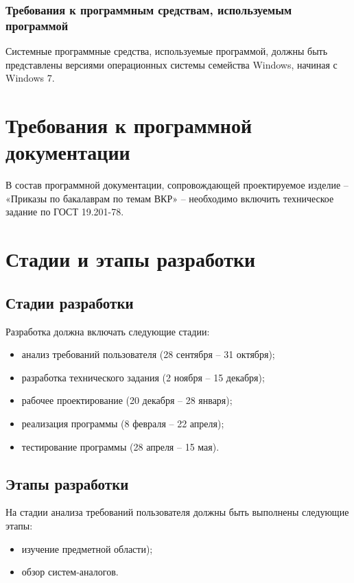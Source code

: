 \documentclass[utf8x]{article}
\begin{document}
\begin{flushleft}
\subsubsection{Требования к программным средствам, используемым программой}

Системные программные средства, используемые программой, должны быть представлены версиями операционных системы семейства Windows, начиная с Windows 7.

\section{Требования к программной документации}

В состав программной документации, сопровождающей проектируемое изделие – «Приказы по бакалаврам по темам ВКР» – необходимо включить техническое задание по ГОСТ 19.201-78.

\section{Стадии и этапы разработки}
\subsection{Стадии разработки}

Разработка должна включать следующие стадии:

\begin{itemize}

\item анализ требований пользователя (28 сентября – 31 октября);
\item разработка технического задания (2 ноября – 15 декабря); 
\item рабочее проектирование (20 декабря – 28 января);
\item реализация программы (8 февраля – 22 апреля);
\item тестирование программы (28 апреля – 15 мая).
\end{itemize}

\subsection{Этапы разработки}

На стадии анализа требований пользователя должны быть выполнены следующие этапы:

\begin{itemize}

\item изучение предметной области);
\item обзор систем-аналогов. 


\end{itemize}
\end{flushleft}
\end{document}
